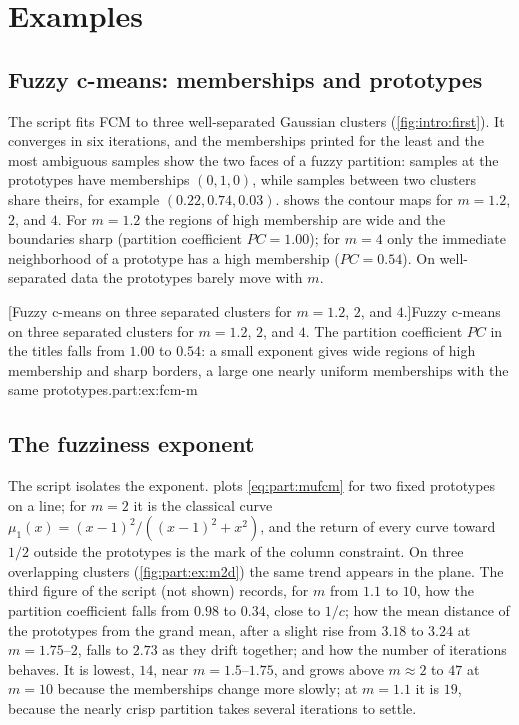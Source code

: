 \section{Examples}\label{sec:part:examples}

\subsection{Fuzzy c-means: memberships and prototypes}\label{sec:part:ex:fcm}

The script  fits FCM to three well-separated Gaussian clusters (\cref{fig:intro:first}). It converges in six iterations, and the memberships printed for the least and the most ambiguous samples show the two faces of a fuzzy partition: samples at the prototypes have memberships $(0,1,0)$, while samples between two clusters share theirs, for example $(0.22,0.74,0.03)$.  shows the contour maps for $m=1.2$, $2$, and $4$. For $m=1.2$ the regions of high membership are wide and the boundaries sharp (partition coefficient $PC=1.00$); for $m=4$ only the immediate neighborhood of a prototype has a high membership ($PC=0.54$). On well-separated data the prototypes barely move with $m$.

[Fuzzy c-means on three separated clusters for $m=1.2$, $2$, and $4$.]{Fuzzy c-means on three separated clusters for $m=1.2$, $2$, and $4$. The partition coefficient $PC$ in the titles falls from $1.00$ to $0.54$: a small exponent gives wide regions of high membership and sharp borders, a large one nearly uniform memberships with the same prototypes.}{part:ex:fcm-m}

\subsection{The fuzziness exponent}\label{sec:part:ex:m}

The script  isolates the exponent.  plots \eqref{eq:part:mufcm} for two fixed prototypes on a line; for $m=2$ it is the classical curve $\mu_1(x)=(x-1)^2/((x-1)^2+x^2)$, and the return of every curve toward $1/2$ outside the prototypes is the mark of the column constraint. On three overlapping clusters (\cref{fig:part:ex:m2d}) the same trend appears in the plane. The third figure of the script (not shown) records, for $m$ from $1.1$ to $10$, how the partition coefficient falls from $0.98$ to $0.34$, close to $1/c$; how the mean distance of the prototypes from the grand mean, after a slight rise from $3.18$ to $3.24$ at $m=1.75$--$2$, falls to $2.73$ as they drift together; and how the number of iterations behaves. It is lowest, $14$, near $m=1.5$--$1.75$, and grows above $m\approx2$ to $47$ at $m=10$ because the memberships change more slowly; at $m=1.1$ it is $19$, because the nearly crisp partition takes several iterations to settle.

